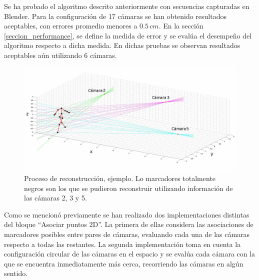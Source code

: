 Se ha probado el algoritmo descrito anteriormente con secuencias capturadas en Blender. Para la configuración de 17 cámaras se han obtenido resultados aceptables,  con errores promedio menores a $0.5\,cm$. En la sección \ref{seccion_performance}, se define la medida de error  y se evalúa el desempeño del algoritmo respecto a dicha medida. En dichas pruebas se observan resultados aceptables aún utilizando 6 cámaras.

\begin{figure}[h!]
\centering
\captionsetup{justification=centering,margin=0.8cm}
\includegraphics[scale=0.5]{img/Reconstruccion/Reconstruccion_3_camaras2.jpg}
\caption{Proceso de reconstrucción, ejemplo. Lo marcadores totalmente negros son los que se pudieron reconstruir utilizando información de las cámaras 2, 3 y 5.}
\end{figure}


Como se mencionó previamente se han realizado dos implementaciones distintas del bloque  “Asociar puntos 2D”. La primera de ellas considera las asociaciones de marcadores posibles entre pares de cámaras, evaluando cada una de las cámaras respecto a todas las restantes.  La segunda implementación toma en cuenta  la configuración circular de las cámaras en el espacio y se evalúa cada cámara con la que se encuentra inmediatamente más cerca,  recorriendo las cámaras en algún sentido.

